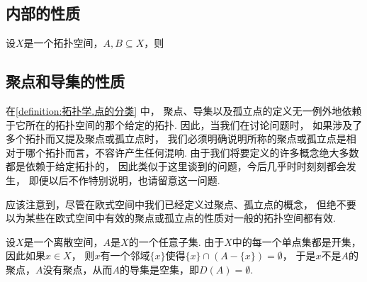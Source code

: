 \subsection{内部的性质}
\begin{property}
设\(X\)是一个拓扑空间，\(A,B \subseteq X\)，则
\end{property}

\subsection{聚点和导集的性质}
在\cref{definition:拓扑学.点的分类} 中，
聚点、导集以及孤立点的定义无一例外地依赖于它所在的拓扑空间的那个给定的拓扑.
因此，当我们在讨论问题时，
如果涉及了多个拓扑而又提及聚点或孤立点时，
我们必须明确说明所称的聚点或孤立点是相对于哪个拓扑而言，不容许产生任何混响.
由于我们将要定义的许多概念绝大多数都是依赖于给定拓扑的，
因此类似于这里谈到的问题，今后几乎时时刻刻都会发生，
即便以后不作特别说明，也请留意这一问题.

应该注意到，尽管在欧式空间中我们已经定义过聚点、孤立点的概念，
但绝不要以为某些在欧式空间中有效的聚点或孤立点的性质对一般的拓扑空间都有效.

\begin{example}[离散空间中的聚点]\label{example:拓扑学.离散空间中的聚点}
设\(X\)是一个离散空间，\(A\)是\(X\)的一个任意子集.
由于\(X\)中的每一个单点集都是开集，因此如果\(x \in X\)，
则\(x\)有一个邻域\(\{x\}\)使得\(\{x\}\cap(A-\{x\})=\emptyset\)，
于是\(x\)不是\(A\)的聚点，\(A\)没有聚点，从而\(A\)的导集是空集，即\(D(A)=\emptyset\).
\end{example}

